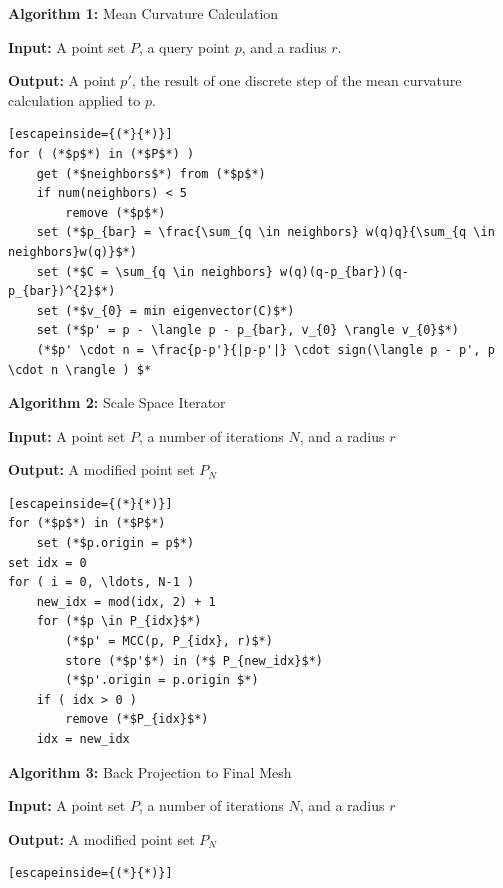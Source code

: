 \documentclass[12pt]{drexelthesis}
\begin{document}
\textbf{Algorithm 1:} Mean Curvature Calculation

	\textbf{Input:} A point set $P$, a query point $p$, and a radius $r$.
	
	\textbf{Output:} A point $p'$, the result of one discrete step of the mean curvature calculation applied to $p$.
\begin{lstlisting}[escapeinside={(*}{*)}]
for ( (*$p$*) in (*$P$*) )
	get (*$neighbors$*) from (*$p$*)
	if num(neighbors) < 5
		remove (*$p$*)
	set (*$p_{bar} = \frac{\sum_{q \in neighbors} w(q)q}{\sum_{q \in neighbors}w(q)}$*)
	set (*$C = \sum_{q \in neighbors} w(q)(q-p_{bar})(q-p_{bar})^{2}$*)
	set (*$v_{0} = min eigenvector(C)$*)
	set (*$p' = p - \langle p - p_{bar}, v_{0} \rangle v_{0}$*)
	(*$p' \cdot n = \frac{p-p'}{|p-p'|} \cdot sign(\langle p - p', p \cdot n \rangle ) $*	
\end{lstlisting}

\textbf{Algorithm 2:} Scale Space Iterator

	\textbf{Input:} A point set $P$, a number of iterations $N$, and a radius $r$
	
	\textbf{Output:} A modified point set $P_{N}$


\begin{lstlisting}[escapeinside={(*}{*)}]
for (*$p$*) in (*$P$*)
	set (*$p.origin = p$*)
set idx = 0
for ( i = 0, \ldots, N-1 )
	new_idx = mod(idx, 2) + 1
	for (*$p \in P_{idx}$*)
		(*$p' = MCC(p, P_{idx}, r)$*)
		store (*$p'$*) in (*$ P_{new_idx}$*)
		(*$p'.origin = p.origin $*)
	if ( idx > 0 )
		remove (*$P_{idx}$*)
	idx = new_idx
\end{lstlisting}

\textbf{Algorithm 3:} Back Projection to Final Mesh

	\textbf{Input:} A point set $P$, a number of iterations $N$, and a radius $r$
	
	\textbf{Output:} A modified point set $P_{N}$


\begin{lstlisting}[escapeinside={(*}{*)}]
\end{lstlisting}
\end{document}
